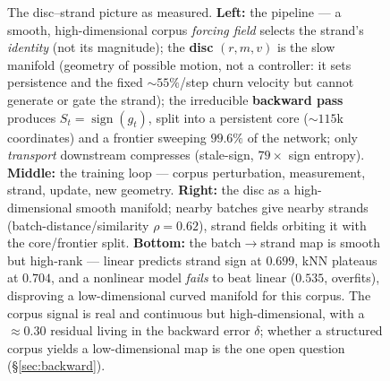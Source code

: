 \begin{figure}[t]
{%
}
\caption{The disc--strand picture as measured. \textbf{Left:} the pipeline ---
a smooth, high-dimensional corpus \emph{forcing field} selects the strand's
\emph{identity} (not its magnitude); the \textbf{disc} $(r,m,v)$ is the slow
manifold (geometry of possible motion, not a controller: it sets persistence and
the fixed $\sim\!55\%$/step churn velocity but cannot generate or gate the
strand); the irreducible \textbf{backward pass} produces
$S_t=\operatorname{sign}(g_t)$, split into a persistent core ($\sim\!115$k
coordinates) and a frontier sweeping $99.6\%$ of the network; only
\emph{transport} downstream compresses (stale-sign, $79\times$ sign entropy).
\textbf{Middle:} the training loop --- corpus perturbation, measurement, strand,
update, new geometry. \textbf{Right:} the disc as a high-dimensional smooth
manifold; nearby batches give nearby strands (batch-distance/similarity
$\rho{=}0.62$), strand fields orbiting it with the core/frontier split.
\textbf{Bottom:} the batch$\rightarrow$strand map is smooth but high-rank ---
linear predicts strand sign at $0.699$, kNN plateaus at $0.704$, and a nonlinear
model \emph{fails} to beat linear ($0.535$, overfits), disproving a
low-dimensional curved manifold for this corpus. The corpus signal is real and
continuous but high-dimensional, with a $\approx\!0.30$ residual living in the
backward error $\delta$; whether a structured corpus yields a low-dimensional map
is the one open question (\S\ref{sec:backward}).}
\label{fig:disc-strand}
\end{figure}

